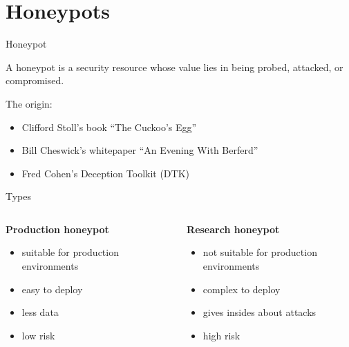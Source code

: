 
\section{Honeypots}

\begin{frame}{Honeypot}
    \begin{block}{\citet{Spitzner2003}}
        A honeypot is a security resource whose value lies in being probed, attacked, or compromised.
    \end{block}
    The origin:
    \begin{itemize}
        \item Clifford Stoll’s book “The Cuckoo’s Egg”\cite{stroll2000}
        \item Bill Cheswick’s whitepaper “An Evening With Berferd”\cite{Cheswick92}
        \item Fred Cohen's Deception Toolkit (DTK)\cite{Spitzner2003}
    \end{itemize}
\end{frame}

\begin{frame}{Types}
    \begin{columns}[T]
        \begin{column}{0.49\textwidth}
            \begin{center}
                \textbf{Production honeypot}
            \end{center}
            \begin{itemize}
                \item suitable for production environments
                \item easy to deploy
                \item less data
                \item low risk
            \end{itemize}
        \end{column}
        \begin{column}{.02\textwidth}
            \rule{.1mm}{0.7\textheight}
        \end{column}
        \begin{column}{0.49\textwidth}
            \begin{center}
                \textbf{Research honeypot}
            \end{center}
            \begin{itemize}
                \item not suitable for production environments
                \item complex to deploy
                \item gives insides about attacks
                \item high risk
            \end{itemize}
        \end{column}
    \end{columns}
\end{frame}

